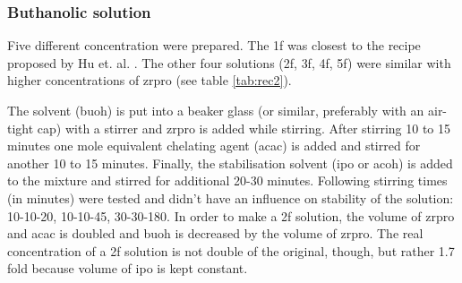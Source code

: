 \documentclass[a4paper]{article}
\newcommand{\td}[1]{\textbf{\textcolor{red}{#1}}}
\newcommand{\ds}[1]{}
\begin{document}
\subsubsection{Buthanolic solution}
\label{sec:sol}
Five different concentration were prepared. 
The \gls{1f} 
was closest to the recipe proposed by Hu et. al. \cite{Hu2016}. 
The other four solutions (\gls{2f}, \gls{3f}, \gls{4f}, \gls{5f}) were similar with higher concentrations of \gls{zrpro} (see table \ref{tab:rec2}).

The solvent (\gls{buoh}) is put into a beaker glass (or similar, preferably with an air-tight cap) with a stirrer and \gls{zrpro} is added while stirring.  
After stirring 10 to 15 minutes one mole equivalent chelating agent (\gls{acac}) is added and stirred for another 10 to 15 minutes. 
Finally, the stabilisation solvent\cite{Hu2016} (\gls{ipo} or \gls{acoh}) is added to the mixture and stirred for additional 20-30 minutes. 
Following stirring times (in minutes) were tested and didn't have an influence on stability of the solution: 10-10-20, 10-10-45, 30-30-180. 
In order to make a \gls{2f} solution, the volume of \gls{zrpro} and \gls{acac} is doubled and \gls{buoh} is decreased by the volume of \gls{zrpro}. 
The real concentration of a \gls{2f} solution is not double of the original, though, but rather 1.7 fold because volume of \gls{ipo} is kept constant.
\end{document}
